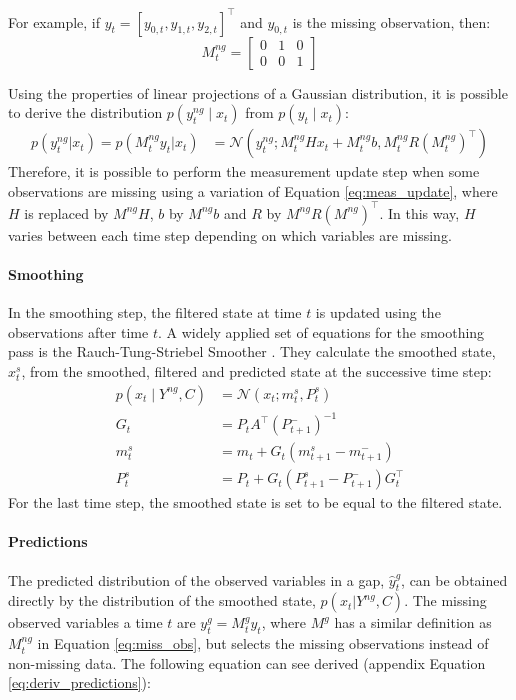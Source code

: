 \documentclass{article}
\newcommand{\norm}[3]{\mathcal{N}\left(#1; #2, #3\right)} %
\begin{document}
For example, if $y_t = [y_{0,t}, y_{1,t}, y_{2,t}]^\top$ and $y_{0,t}$ is the missing observation, then:
\begin{equation*}
 M^{ng}_t = \left[\begin{array}{ccc}
    0 & 1 & 0 \\
    0 & 0 & 1
\end{array}\right]
\end{equation*}

Using the properties of linear projections of a Gaussian distribution, it is possible to derive the distribution $p(y^{ng}_t \mid x_t)$ from $p(y_t \mid x_t)$: 
 \begin{align*}
   p(y^{ng}_t|x_t) = p(M^{ng}_ty_t|x_t) &=   \norm{y^{ng}_t}{M^{ng}_tHx_t + M^{ng}_tb}{M^{ng}_tR(M^{ng}_t)^\top}%
\end{align*}
Therefore, it is possible to perform the measurement update step when some observations are missing using a variation of Equation \ref{eq:meas_update}, where $H$ is replaced by $M^{ng}H$, $b$ by $M^{ng}b$ and $R$ by $M^{ng}R(M^{ng})^\top$. In this way, $H$ varies between each time step depending on which variables are missing.

\paragraph{Smoothing}

In the smoothing step, the filtered state at time $t$ is updated using the observations after time $t$. A widely applied set of equations for the smoothing pass is the Rauch-Tung-Striebel Smoother \cite{rauch_maximum_1965}. They calculate the smoothed state, $x_t^s$, from the smoothed, filtered and predicted state at the successive time step:
\begin{align}\label{eq:smoother}
    p(x_t \mid Y^{ng}, C) &= \norm{x_t}{m_t^s}{P_t^s} \\
    G_t &= P_tA^\top(P_{t+1}^-)^{-1}\\
    m_t^s &= m_t + G_t(m_{t+1}^s - m_{t+1}^-) \\
    P_t^s &= P_t + G_t(P_{t+1}^s - P_{t+1}^-)G_t^\top 
\end{align}
For the last time step, the smoothed state is set to be equal to the filtered state.

\paragraph{Predictions} The predicted distribution of the observed variables in a gap, $\hat{y}^g_t$, can be obtained directly by the distribution of the smoothed state, $p(x_t | Y^{ng}, C)$.
The missing observed variables a time $t$ are $y^g_t = M^g_ty_t$, where $M^{g}$ has a similar definition as $M^{ng}_t$ in Equation \ref{eq:miss_obs}, but selects the missing observations instead of  non-missing data.
The following equation can see derived (appendix Equation \ref{eq:deriv_predictions}):
\end{document}
